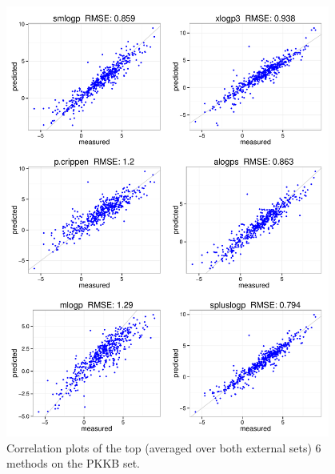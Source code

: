 \documentclass[]{article}
\begin{document}
\begin{figure}[ht]
  \centering
  \includegraphics[width=0.95\textwidth]{./figures_si/pkkb_scatter_1.pdf}
  \caption{Correlation plots of the top (averaged over both external sets) 6 methods on the PKKB set.}
  \label{fig:external_comparison3}
\end{figure}
\end{document}

